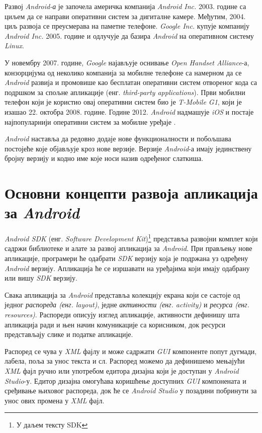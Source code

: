\documentclass[12pt,oneside]{memoir}
\begin{document}
Развој \textit{Android-а} је започела америчка компанија \textit{Android Inc.} 2003. године са циљем да се направи оперативни систем за дигиталне камере. Међутим, 2004. циљ развоја се преусмерава на паметне телефоне. \textit{Google Inc.} купује компанију \textit{Android Inc.} 2005. године и одлучује да базира \textit{Android} на оперативном систему \textit{Linux}.

У новембру 2007. године, \textit{Google} најављује оснивање \textit{Open Handset Alliance}-а, конзорцијума од неколико компанија за мобилне телефоне са намерном да се \textit{Android} развија и промовише као бесплатан оперативни систем отвореног кода са подршком за спољне апликације (енг. \textit{third-party applications}). Први мобилни телефон који је користио овај оперативни систем био је \textit{T-Mobile G1}, који је изашао 22. октобра 2008. године. Године 2012. \textit{Android} надмашује \textit{iOS} и постаје најпопуларнији оперативни систем за мобилне уређаје \cite{history_of_android}. 

\textit{Android} наставља да редовно додаје нове функционалности и побољшава постојеће које објављује кроз нове верзије. Верзије \textit{Android}-а имају јединствену бројну верзију и кодно име које носи назив одређеног слаткиша. 


\section{Основни концепти развоја апликација за \textit{Android}}


\textit{Android SDK} (енг. \textit{Software Development Kit})\footnote{У даљем тексту SDK} представља развојни комплет који 
садржи библиотеке и алате за развој апликација за \textit{Android}. При прављењу нове апликације, програмери ће одабрати \textit{SDK} верзију која је подржана уз одређену \textit{Android} верзију. Апликација ће се изршавати на уређајима који имају одабрану или вишу \textit{SDK} верзију.

Свака апликација за \textit{Android} представља колекцију екрана који се састоје од једног \textit{распореда (енг. layout)}, једне \textit{активности (енг. activity)} и \textit{ресурса (енг. resources)}. 
Распореди описују изглед апликације, активности дефинишу шта апликација ради и њен начин комуникације са корисником, док ресурси представљају слике и податке апликације.

Распоред се чува у \textit{XML} фајлу и може садржати \textit{GUI} компоненте попут дугмади, лабела, поља за унос текста и сл. Распоред можемо да дефинишемо мењајући \textit{XML} фајл ручно или употребом едитора дизајна који је доступан у \textit{Android Studio}-у. Едитор дизајна омогућава коришћење доступних \textit{GUI} компонената и сређивање њиховог распореда, док ће се \textit{Android Studio} у позадини побринути за унос ових промена у \textit{XML} фајл. 
\end{document}
